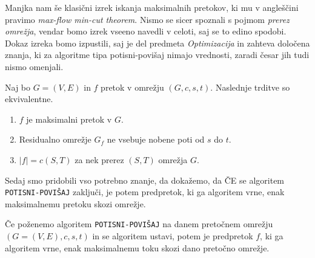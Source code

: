 \documentclass[mat1]{fmfdelo}
\begin{document}
Manjka nam še klasični izrek iskanja maksimalnih pretokov, ki mu v angleščini pra\-vimo \textit{max-flow min-cut theorem}. Nismo se sicer spoznali s pojmom \textit{prerez omrežja}, vendar bomo izrek vseeno navedli v celoti, saj se to edino spodobi. Dokaz izreka bomo izpustili, saj je del predmeta \textit{Optimizacija} in zahteva
določena znanja, ki za algoritme tipa potisni-povišaj nimajo vrednosti, zaradi česar jih tudi nismo omenjali.

\begin{izrek} \label{izr:maxflowmincut}
  Naj bo $G = (V,E)$ in $f$ pretok v omrežju $(G, c, s, t)$. Naslednje trditve so ekvivalentne.
  \begin{enumerate}
    \item $f$ je maksimalni pretok v $G$.
    \item Residualno omrežje $G_f$ ne vsebuje nobene poti od $s$ do $t$.
    \item $|f| = c(S, T)$ za nek prerez $(S,T)$ omrežja $G$.
  \end{enumerate}
\end{izrek}

Sedaj smo pridobili vso potrebno znanje, da dokažemo, da ČE se algoritem \texttt{POTISNI-POVIŠAJ} zaključi, je potem predpretok, ki ga algoritem vrne, enak ma\-ksimalnemu pretoku skozi omrežje.

\begin{izrek}
Če poženemo algoritem \texttt{POTISNI-POVIŠAJ} na danem pretočnem omrežju $(G=(V,E),c,s,t)$ in se algoritem ustavi, potem je predpretok $f$, ki ga algoritem vrne, enak maksimalnemu toku skozi dano pretočno omrežje.
\end{izrek}
\end{document}
